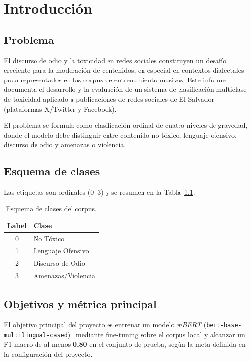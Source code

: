\chapter{Introducción}
\label{ch:intro}

\section{Problema}

El discurso de odio y la toxicidad en redes sociales constituyen un desafío creciente
para la moderación de contenidos, en especial en contextos dialectales poco
representados en los corpus de entrenamiento masivos. Este informe documenta el
desarrollo y la evaluación de un sistema de clasificación multiclase de toxicidad
aplicado a publicaciones de redes sociales de El Salvador (plataformas X/Twitter y
Facebook).

El problema se formula como clasificación ordinal de cuatro niveles de gravedad, donde
el modelo debe distinguir entre contenido no tóxico, lenguaje ofensivo, discurso de
odio y amenazas o violencia.

\section{Esquema de clases}

Las etiquetas son ordinales (0--3) y se resumen en la Tabla~\ref{tab:clases}.

\begin{table}[H]
\centering
\caption{Esquema de clases del corpus.}
\label{tab:clases}
\begin{tabular}{cl}
\toprule
Label & Clase \\
\midrule
0 & No Tóxico \\
1 & Lenguaje Ofensivo \\
2 & Discurso de Odio \\
3 & Amenazas/Violencia \\
\bottomrule
\end{tabular}
\end{table}

\section{Objetivos y métrica principal}

El objetivo principal del proyecto es entrenar un modelo \emph{mBERT}
(\texttt{bert-base-multilingual-cased})~\cite{devlin2019bert} mediante fine-tuning
sobre el corpus local y alcanzar un F1-macro de al menos \textbf{0{,}80} en el
conjunto de prueba, según la meta definida en la configuración del proyecto.

